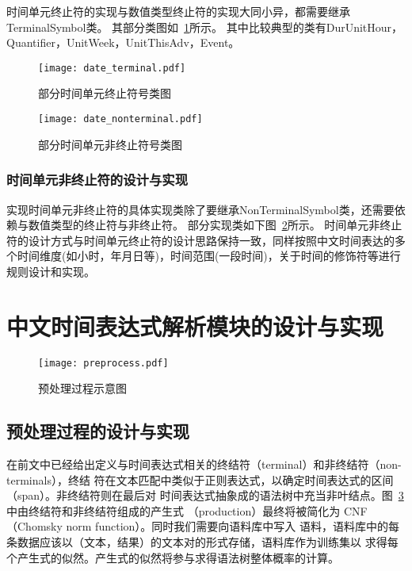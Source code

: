 时间单元终止符的实现与数值类型终止符的实现大同小异，都需要继承TerminalSymbol类。 其部分类图如~\ref{fig:date_terminal}所示。
其中比较典型的类有DurUnitHour，Quantifier，UnitWeek，UnitThisAdv，Event。


\begin{figure}[h]
    \centering
    \texttt{[image: date\_terminal.pdf]}
    \caption{部分时间单元终止符号类图}
    \label{fig:date_terminal}
\end{figure}

\begin{figure}[h]
    \centering
    \texttt{[image: date\_nonterminal.pdf]}
    \caption{部分时间单元非终止符号类图}
    \label{fig:date_nonterminal}
\end{figure}


\subsubsection{时间单元非终止符的设计与实现}


实现时间单元非终止符的具体实现类除了要继承NonTerminalSymbol类，还需要依赖与数值类型的终止符与非终止符。 部分实现类如下图~\ref{fig:date_nonterminal}所示。
时间单元非终止符的设计方式与时间单元终止符的设计思路保持一致，同样按照中文时间表达的多个时间维度(如小时，年月日等)，时间范围(一段时间)，关于时间的修饰符等进行规则设计和实现。


\section{中文时间表达式解析模块的设计与实现}

\begin{figure}[h]
    \centering
    \texttt{[image: preprocess.pdf]}
    \caption{预处理过程示意图}
    \label{fig:preprocess}
\end{figure}


\subsection{预处理过程的设计与实现}

在前文中已经给出定义与时间表达式相关的终结符（terminal）和非终结符（non-terminals），终结
符在文本匹配中类似于正则表达式，以确定时间表达式的区间（span）。非终结符则在最后对
时间表达式抽象成的语法树中充当非叶结点。图~\ref{fig:preprocess}中由终结符和非终结符组成的产生式
（production）最终将被简化为 CNF（Chomsky norm function）。同时我们需要向语料库中写入
语料，语料库中的每条数据应该以（文本，结果）的文本对的形式存储，语料库作为训练集以
求得每个产生式的似然。产生式的似然将参与求得语法树整体概率的计算。

